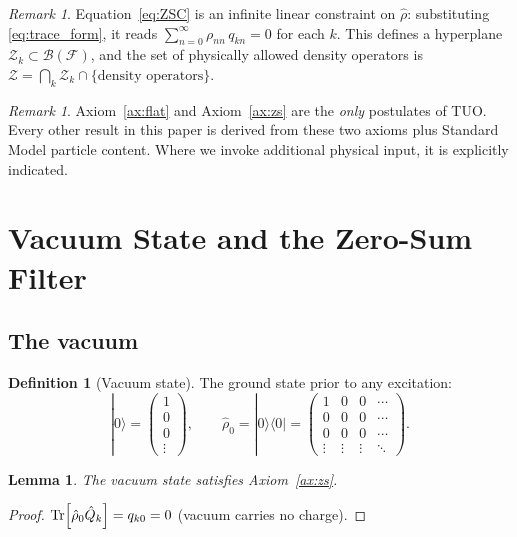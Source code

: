 \documentclass[12pt,a4paper]{article}
\newtheorem{lemma}[theorem]{Lemma}
\theoremstyle{definition}
\newtheorem{definition}[theorem]{Definition}
\theoremstyle{remark}
\newtheorem{remark}[theorem]{Remark}
\newcommand{\rhohat}{\hat{\rho}}
\newcommand{\Qhat}{\hat{Q}}
\newcommand{\Fock}{\mathcal{F}}
\newcommand{\ZSC}{\mathcal{Z}}
\begin{document}
\begin{remark}
Equation~\eqref{eq:ZSC} is an infinite linear constraint on $\rhohat$:
substituting \eqref{eq:trace_form}, it reads
$\sum_{n=0}^\infty \rho_{nn}\,q_{kn} = 0$ for each $k$.
This defines a hyperplane $\ZSC_k \subset \mathcal{B}(\Fock)$, and the
set of physically allowed density operators is
$\ZSC = \bigcap_k \ZSC_k \cap \{\text{density operators}\}$.
\end{remark}

\begin{remark}
Axiom~\ref{ax:flat} and Axiom~\ref{ax:zs} are the \emph{only} postulates
of TUO.
Every other result in this paper is derived from these two axioms plus
Standard Model particle content.
Where we invoke additional physical input, it is explicitly indicated.
\end{remark}

\section{Vacuum State and the Zero-Sum Filter}
\label{sec:vacuum}

\subsection{The vacuum}

\begin{definition}[Vacuum state]
The ground state prior to any excitation:
\begin{equation}
  |0\rangle = \begin{pmatrix}1\\0\\0\\\vdots\end{pmatrix},
  \qquad
  \rhohat_0 = |0\rangle\langle 0|
  = \begin{pmatrix}
    1 & 0 & 0 & \cdots \\
    0 & 0 & 0 & \cdots \\
    0 & 0 & 0 & \cdots \\
    \vdots & \vdots & \vdots & \ddots
  \end{pmatrix}.
\end{equation}
\end{definition}

\begin{lemma}
The vacuum state satisfies Axiom~\ref{ax:zs}.
\end{lemma}
\begin{proof}
$\Tr[\rhohat_0\Qhat_k] = q_{k0} = 0$ (vacuum carries no charge).
\end{proof}
\end{document}
